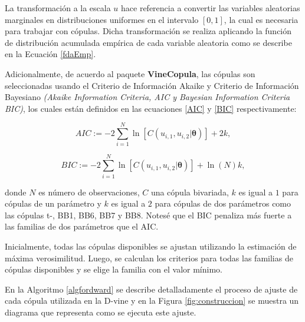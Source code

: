 La transformación a la escala $u$ hace referencia a convertir las variables aleatorias marginales en distribuciones uniformes en el intervalo $[0, 1]$, la cual es necesaria para trabajar con cópulas. Dicha transformación se realiza aplicando la función de distribución acumulada empírica de cada variable aleatoria como se describe en la Ecuación \eqref{fdaEmp}.

Adicionalmente, de acuerdo al paquete \textbf{VineCopula}, las cópulas son seleccionadas usando el Criterio de Información Akaike y Criterio de Información Bayesiano \textit{(Akaike Information Criteria, AIC y Bayesian Information Criteria BIC)}, los cuales están definidos en las ecuaciones \eqref{AIC} y \eqref{BIC} respectivamente:

\begin{equation}\label{AIC}
    AIC := -2 \sum_{i=1}^N \ln[C(u_{i,1},u_{i,2}|\boldsymbol{\theta})] + 2k,
\end{equation}

\begin{equation}\label{BIC}
    BIC := -2 \sum_{i=1}^N \ln[C(u_{i,1},u_{i,2}|\boldsymbol{\theta})] + \ln(N)k,
\end{equation}

donde $N$ es número de observaciones, $C$ una cópula bivariada, $k$ es igual a $1$ para cópulas de un parámetro y $k$ es igual a $2$ para cópulas de dos parámetros como las cópulas t-, BB1, BB6, BB7 y BB8. Notesé que el BIC penaliza más fuerte a las familias de dos parámetros que el AIC.

Inicialmente, todas las cópulas disponibles se ajustan utilizando la estimación de máxima verosimilitud. Luego, se calculan los criterios para todas las familias de cópulas disponibles y se elige la familia con el valor mínimo.


En la Algoritmo \ref{algfordward} se describe detalladamente el proceso de ajuste de cada cópula utilizada en la D-vine y en la Figura \ref{fig:construccion} se muestra un diagrama que representa como se ejecuta este ajuste.

